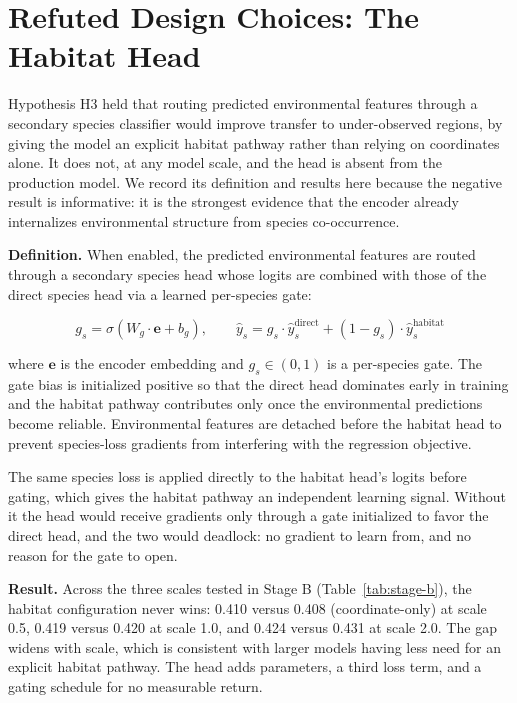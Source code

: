 \section{Refuted Design Choices: The Habitat Head}
\label{sec:E-refuted-design-choices}

Hypothesis H3 held that routing predicted environmental features through a secondary species classifier would improve transfer to under-observed regions, by giving the model an explicit habitat pathway rather than relying on coordinates alone. It does not, at any model scale, and the head is absent from the production model. We record its definition and results here because the negative result is informative: it is the strongest evidence that the encoder already internalizes environmental structure from species co-occurrence.

\textbf{Definition.} When enabled, the predicted environmental features are routed through a secondary species head whose logits are combined with those of the direct species head via a learned per-species gate:

\begin{equation*}
g_s = \sigma(W_g \cdot \mathbf{e} + b_g), \qquad
\hat{y}_s = g_s \cdot \hat{y}_s^\text{direct} + (1 - g_s) \cdot \hat{y}_s^\text{habitat}
\end{equation*}

where $\mathbf{e}$ is the encoder embedding and $g_s \in (0, 1)$ is a per-species gate. The gate bias is initialized positive so that the direct head dominates early in training and the habitat pathway contributes only once the environmental predictions become reliable. Environmental features are detached before the habitat head to prevent species-loss gradients from interfering with the regression objective.

The same species loss is applied directly to the habitat head's logits before gating, which gives the habitat pathway an independent learning signal. Without it the head would receive gradients only through a gate initialized to favor the direct head, and the two would deadlock: no gradient to learn from, and no reason for the gate to open.

\textbf{Result.} Across the three scales tested in Stage B (Table~\ref{tab:stage-b}), the habitat configuration never wins: 0.410 versus 0.408 (coordinate-only) at scale 0.5, 0.419 versus 0.420 at scale 1.0, and 0.424 versus 0.431 at scale 2.0. The gap widens with scale, which is consistent with larger models having less need for an explicit habitat pathway. The head adds parameters, a third loss term, and a gating schedule for no measurable return.



